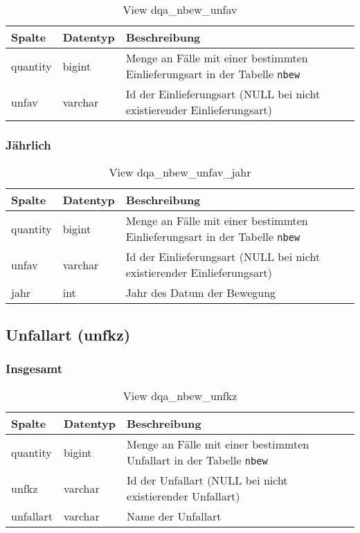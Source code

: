 \begin{table}[ht]
	\centering   
	\caption{View dqa\_nbew\_unfav}
	\label{tab:bewUnfavI}
	\begin{tabular}{||l|l|p{10cm}||}   		
		\hline
		Spalte & Datentyp & Beschreibung \\ [0.5ex]
		\hline\hline
		quantity & bigint & Menge an Fälle mit einer bestimmten Einlieferungsart in der Tabelle \texttt{nbew} \\
		\hline
		unfav & varchar & Id der Einlieferungsart (NULL bei nicht existierender Einlieferungsart)\\
		\hline
		
	\end{tabular}
\end{table}

\subsubsection{Jährlich} \label{subsubsec:bewUnfavJ}

\begin{table}[ht]
	\centering   
	\caption{View dqa\_nbew\_unfav\_jahr}
	\label{tab:bewUnfavJ}
	\begin{tabular}{||l|l|p{10cm}||}
		\hline
		Spalte & Datentyp & Beschreibung \\ [0.5ex]
		\hline\hline
		quantity & bigint & Menge an Fälle mit einer bestimmten Einlieferungsart in der Tabelle \texttt{nbew}\\
		\hline
		unfav & varchar & Id der Einlieferungsart (NULL bei nicht existierender Einlieferungsart)\\
		\hline
		jahr & int &  Jahr des Datum der Bewegung \\
		\hline		
	\end{tabular}
\end{table}

\subsection{Unfallart (unfkz)} \label{subsec:bewUnfkz}

\subsubsection{Insgesamt} \label{subsubsec:bewUnfkzI}

\begin{table}[ht]
	\centering   
	\caption{View dqa\_nbew\_unfkz}
	\label{tab:bewUnfkzI}
	\begin{tabular}{||l|l|p{10cm}||}   		
		\hline
		Spalte & Datentyp & Beschreibung \\ [0.5ex]
		\hline\hline
		quantity & bigint & Menge an Fälle mit einer bestimmten Unfallart in der Tabelle \texttt{nbew} \\
		\hline
		unfkz & varchar & Id der Unfallart (NULL bei nicht existierender Unfallart)\\
		\hline
		unfallart & varchar & Name der Unfallart \\
		\hline
		
	\end{tabular}
\end{table}

